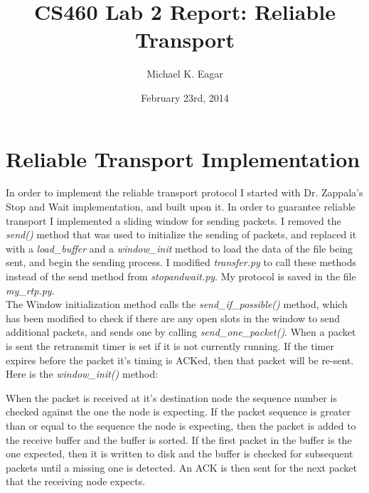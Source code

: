 \documentclass[11pt]{article}
\begin{document}

\title{CS460 Lab 2 Report: Reliable Transport}

\author{Michael K. Eagar}

\date{February 23rd, 2014}

\maketitle

\section{Reliable Transport Implementation}

In order to implement the reliable transport protocol I started with Dr. Zappala's Stop and Wait implementation, and built upon it. In order to guarantee reliable transport I implemented a sliding window for sending packets. I removed the \textit{send()} method that was used to initialize the sending of packets, and replaced it with a \textit{load\_buffer} and a \textit{window\_init} method to load the data of the file being sent, and begin the sending process. I modified \textit{transfer.py} to call these methods instead of the send method from \textit{stopandwait.py}. My protocol is saved in the file \textit{my\_rtp.py}.\\

The Window initialization method calls the \textit{send\_if\_possible()} method, which has been modified to check if there are any open slots in the window to send additional packets, and sends one by calling \textit{send\_one\_packet()}. When a packet is sent the retransmit timer is set if it is not currently running. If the timer expires before the packet it's timing is ACKed, then that packet will be re-sent. Here is the \textit{window\_init()} method:


\vspace{0.25cm}

When the packet is received at it's destination node the sequence number is checked against the one the node is expecting. If the packet sequence is greater than or equal to the sequence the node is expecting, then the packet is added to the receive buffer and the buffer is sorted. If the first packet in the buffer is the one expected, then it is written to disk and the buffer is checked for subsequent packets until a missing one is detected. An ACK is then sent for the next packet that the receiving node expects.\\
\end{document}
